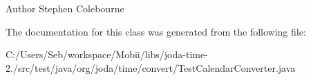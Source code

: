 \begin{DoxyAuthor}{Author}
Stephen Colebourne 
\end{DoxyAuthor}


The documentation for this class was generated from the following file\-:\begin{DoxyCompactItemize}
\item 
C\-:/\-Users/\-Seb/workspace/\-Mobii/libs/joda-\/time-\/2./src/test/java/org/joda/time/convert/Test\-Calendar\-Converter.\-java\end{DoxyCompactItemize}
